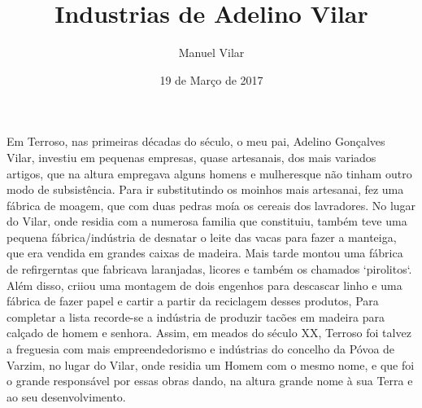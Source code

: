 \documentclass{article}
\title{Industrias de Adelino Vilar}
\author{Manuel Vilar}
\date{19 de Março de 2017}
\begin{document}
\maketitle
Em Terroso, nas primeiras décadas do século, o meu pai, Adelino Gonçalves Vilar, investiu em pequenas empresas, quase artesanais, dos mais variados artigos, que na altura empregava alguns homens e mulheresque não tinham outro modo de subsistência.
Para ir substitutindo os moinhos mais artesanai, fez uma fábrica de moagem, que com duas pedras moía os cereais dos lavradores.
No lugar do Vilar, onde residia com a numerosa familia que constituiu, também teve uma pequena fábrica/indústria de desnatar o leite das vacas para fazer a manteiga, que era vendida em grandes caixas de madeira.
Mais tarde montou uma fábrica de refirgerntas que fabricava laranjadas, licores e também os chamados `pirolitos`.
Além disso, criiou uma montagem de dois engenhos para descascar linho e uma fábrica de fazer papel e cartir a partir da reciclagem desses produtos, 
Para completar a lista recorde-se a indústria de produzir tacões em madeira para calçado de homem e senhora.
Assim, em meados do século XX, Terroso foi talvez a freguesia com mais empreendedorismo e indústrias do concelho da Póvoa de Varzim, no lugar do Vilar, onde residia um Homem com o mesmo nome, e que foi o grande responsável por essas obras dando, na altura grande nome à sua Terra e ao seu desenvolvimento.

\printindex
\end{document}
